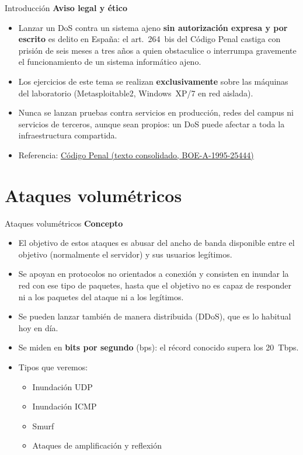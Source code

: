 \documentclass[aspectratio=169,11pt]{beamer}
\newcommand{\subt}[1]{{\color{uznavy}\bfseries #1}\par\smallskip}
\begin{document}
\begin{frame}{Introducción}
\small
\subt{Aviso legal y ético}
  \begin{itemize}
  \item Lanzar un DoS contra un sistema ajeno \textbf{sin autorización expresa y por escrito} es delito en España: el art.~264~bis del Código Penal castiga con prisión de seis meses a tres años a quien obstaculice o interrumpa gravemente el funcionamiento de un sistema informático ajeno.
  \item Los ejercicios de este tema se realizan \textbf{exclusivamente} sobre las máquinas del laboratorio (Metasploitable2, Windows~XP/7 en red aislada).
  \item Nunca se lanzan pruebas contra servicios en producción, redes del campus ni servicios de terceros, aunque sean propios: un DoS puede afectar a toda la infraestructura compartida.
  \item Referencia: \href{https://www.boe.es/buscar/act.php?id=BOE-A-1995-25444}{Código Penal (texto consolidado, BOE-A-1995-25444)}
  \end{itemize}
\end{frame}


\section{Ataques volumétricos}

\begin{frame}[allowframebreaks]{Ataques volumétricos}
\small
\subt{Concepto}
  \begin{itemize}
  \item El objetivo de estos ataques es abusar del ancho de banda disponible entre el objetivo (normalmente el servidor) y sus usuarios legítimos.
  \item Se apoyan en protocolos no orientados a conexión y consisten en inundar la red con ese tipo de paquetes, hasta que el objetivo no es capaz de responder ni a los paquetes del ataque ni a los legítimos.
  \item Se pueden lanzar también de manera distribuida (DDoS), que es lo habitual hoy en día.
  \item Se miden en \textbf{bits por segundo} (bps): el récord conocido supera los 20~Tbps.
  \item Tipos que veremos:
    \begin{itemize}
    \item Inundación UDP
    \item Inundación ICMP
    \item Smurf
    \item Ataques de amplificación y reflexión
    \end{itemize}
  \end{itemize}
\end{frame}
\end{document}
